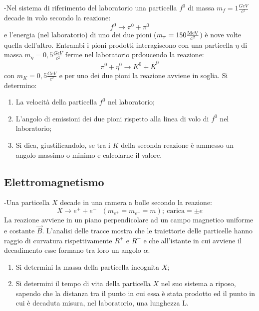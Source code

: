\documentclass[12pt,twoside,a4]{article}
\begin{document}
\newpage
\begin{esercizio}
	-Nel sistema di riferimento del laboratorio una particella $f^0$ di massa $m_f= 1 \frac{GeV}{c^2}$ decade in volo secondo la reazione:
	\begin{equation*}
		f^0 \rightarrow \pi^0 + \pi^0
	\end{equation*}
	e l'energia (nel laboratorio) di uno dei due pioni ($m_\pi =150 \frac{\mathrm{MeV}}{c^2}$) è nove volte quella dell'altro. Entrambi i pioni prodotti interagiscono con una particella $\eta$ di massa $m_\eta=0,5 \frac{GeV}{c^2}$ ferme nel laboratorio prdoucendo la reazione:
	\begin{equation*}
		\pi^0 + \eta^0 \rightarrow K^0 + \overline K^0
	\end{equation*}
	con $m_K=0,5 \frac{GeV}{c^2}$ e per uno dei due pioni la reazione avviene in soglia. Si determino:
	\begin{enumerate}[label=(\textit{\roman*})]
		\item La velocità  della particella $f^0$ nel laboratorio;
		\item L'angolo di emissioni dei due pioni rispetto alla linea di volo di $f^0$ nel laboratorio;
		\item Si dica, giustificandolo, se tra i $K$ della seconda reazione è ammesso un angolo massimo o minimo e calcolarne il valore.
	\end{enumerate}
\end{esercizio}

\newpage
{}
\subsection{Elettromagnetismo}
\begin{esercizio}
	-Una particella $X$ decade in una camera a bolle secondo la reazione:
	\begin{equation*}
		X \rightarrow e^++e^- \ \ \ (m_{e^+}=m_{e^-}=m); \ \text{carica}=\pm e
	\end{equation*}
	La reazione avviene in un piano perpendicolare ad un campo magnetico uniforme e costante $\vec B$. L'analisi delle tracce mostra che le traiettorie delle particelle hanno raggio di curvatura rispettivamente $R^+$ e $R^-$ e che all'istante in cui avviene il decadimento esse formano tra loro un angolo $\alpha$.
	\begin{enumerate}[label=(\textit{\roman*})]
		\item Si determini la massa della particella incognita $X$;
		\item Si determini il tempo di vita della particella $X$ nel suo sistema a riposo, sapendo che la distanza tra il punto in cui essa è stata prodotto ed il punto in cui è decaduta misura, nel laboratorio, una lunghezza L.
	\end{enumerate}
\end{esercizio}
\end{document}
